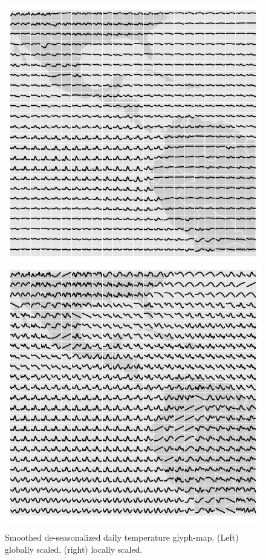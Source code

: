 \documentclass[oneside]{article}
\begin{document}
\begin{figure}[htbp]
  \centering
  \includegraphics[width=0.5\linewidth]{month-rescale-max}%
  \includegraphics[width=0.5\linewidth]{month-rescale01}
  \caption{Smoothed de-seasonalized daily temperature glyph-map. (Left) %
globally scaled, (right) locally scaled.}
  \label{fig:scaling}
\end{figure}



\end{document}
